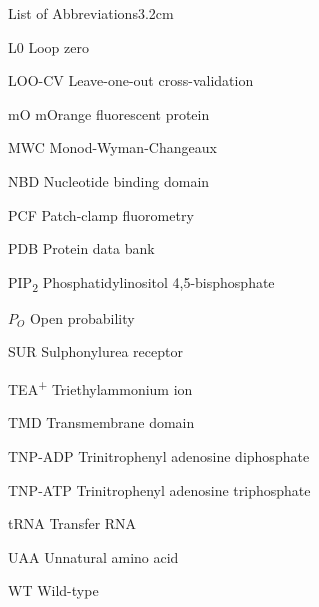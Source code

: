 \begin{mclistof}{List of Abbreviations}{3.2cm}
\item[L0] Loop zero

\item[LOO-CV] Leave-one-out cross-validation

\item[mO] mOrange fluorescent protein

\item[MWC] Monod-Wyman-Changeaux

\item[NBD] Nucleotide binding domain

\item[PCF] Patch-clamp fluorometry

\item[PDB] Protein data bank

\item[PIP\textsubscript{2}] Phosphatidylinositol 4,5-bisphosphate

\item[$P_O$] Open probability

\item[SUR] Sulphonylurea receptor

\item[TEA\textsuperscript{+}] Triethylammonium ion

\item[TMD] Transmembrane domain

\item[TNP-ADP] Trinitrophenyl adenosine diphosphate

\item[TNP-ATP] Trinitrophenyl adenosine triphosphate

\item[tRNA] Transfer RNA

\item[UAA] Unnatural amino acid

\item[WT] Wild-type

\end{mclistof}

